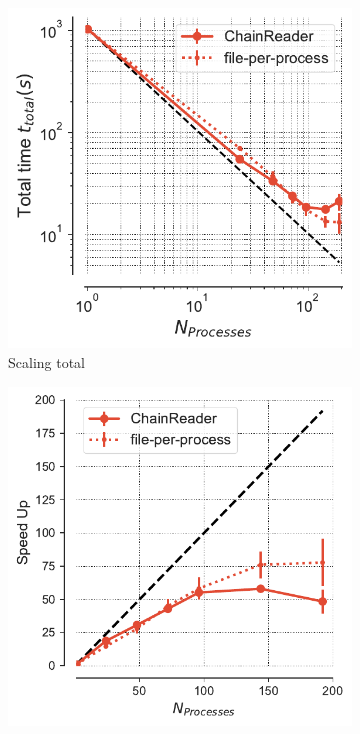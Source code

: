 \begin{figure}[!htb]
\centering
\begin{subfigure}{.4\textwidth}
  \includegraphics[width=\linewidth]{figures/Comparison_tot_time_traj_splitting_chain-reader.pdf}
  \caption{Scaling total}
  \label{fig:MPItottime-chain-reader}
\end{subfigure}
\hfill
\begin{subfigure}{.4\textwidth}
  \includegraphics[width=\linewidth]{figures/Comparison_Speed_UP_traj_splitting_chain-reader.pdf}

\end{subfigure}
\end{figure}
